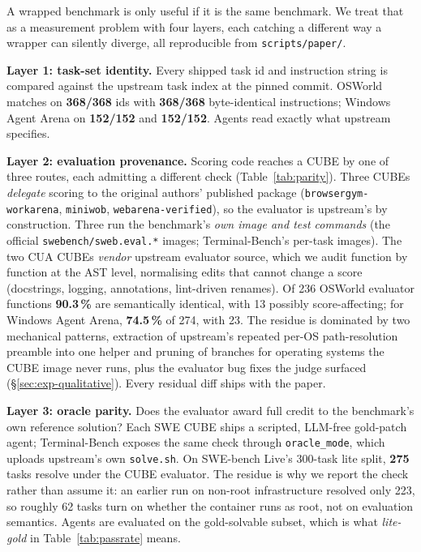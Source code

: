 \documentclass{article}
\newcommand{\mypar}[1]{\par\noindent\textbf{#1}\enspace}
\begin{document}
A wrapped benchmark is only useful if it is the same benchmark. We treat that
as a measurement problem with four layers, each catching a different way a
wrapper can silently diverge, all reproducible from \texttt{scripts/paper/}.

\mypar{Layer 1: task-set identity.}
Every shipped task id and instruction string is compared against the upstream
task index at the pinned commit. OSWorld matches on \textbf{368/368} ids with
\textbf{368/368} byte-identical instructions; Windows Agent Arena on
\textbf{152/152} and \textbf{152/152}. Agents read exactly what upstream
specifies.

\mypar{Layer 2: evaluation provenance.}
Scoring code reaches a CUBE by one of three routes, each admitting a different
check (Table~\ref{tab:parity}). Three CUBEs \emph{delegate} scoring to the
original authors' published package (\texttt{browsergym-workarena},
\texttt{miniwob}, \texttt{webarena-verified}), so the evaluator is upstream's by
construction. Three run the benchmark's \emph{own image and test commands} (the
official \texttt{swebench/sweb.eval.*} images; Terminal-Bench's per-task
images). The two CUA CUBEs \emph{vendor} upstream evaluator source, which we
audit function by function at the AST level, normalising edits that cannot
change a score (docstrings, logging, annotations, lint-driven renames). Of 236
OSWorld evaluator functions \textbf{90.3\,\%} are semantically identical, with
13 possibly score-affecting; for Windows Agent Arena, \textbf{74.5\,\%} of 274,
with 23. The residue is dominated by two mechanical patterns, extraction of
upstream's repeated per-OS path-resolution preamble into one helper and pruning
of branches for operating systems the CUBE image never runs, plus the evaluator
bug fixes the judge surfaced (\S\ref{sec:exp-qualitative}). Every residual diff
ships with the paper.

\mypar{Layer 3: oracle parity.}
Does the evaluator award full credit to the benchmark's own reference solution?
Each SWE CUBE ships a scripted, LLM-free gold-patch agent; Terminal-Bench
exposes the same check through \texttt{oracle\_mode}, which uploads upstream's
own \texttt{solve.sh}. On SWE-bench Live's 300-task lite split, \textbf{275}
tasks resolve under the CUBE evaluator. The residue is why we report the check
rather than assume it: an earlier run on non-root infrastructure resolved only
223, so roughly 62 tasks turn on whether the container runs as root, not on
evaluation semantics. Agents are evaluated on the gold-solvable subset, which
is what \emph{lite-gold} in Table~\ref{tab:passrate} means.
\end{document}
